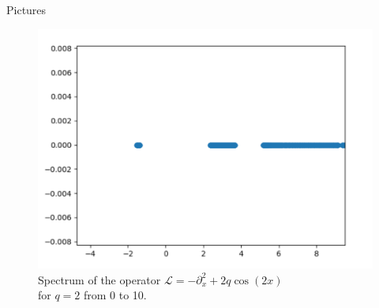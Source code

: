 \documentclass{beamer}
\begin{document}
\begin{frame}{Pictures}

\begin{figure}
\centering\captionsetup{width =\dimexpr\textwidth-2cm, format=hang}
 \begin{center}
\includegraphics[scale=0.35]{FIXED_Spectrum_Plot_Example03.PNG}
 \end{center}
 \captionsetup{format=hang}
\caption{Spectrum of the operator $\mathcal{L} = -\partial_{x}^2 + 2q\cos(2x)$ \\ for $q=2$ from 0 to 10.}

\end{figure}

\end{frame}








\end{document}
